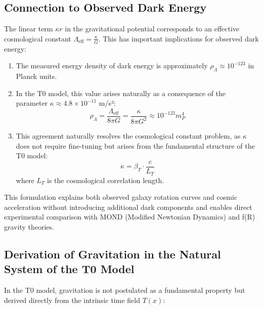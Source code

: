 \documentclass[12pt,a4paper]{article}
\begin{document}
	\subsection*{Connection to Observed Dark Energy}
	
	The linear term $\kappa r$ in the gravitational potential corresponds to an effective cosmological constant $\Lambda_{\text{eff}} = \frac{\kappa}{G}$. This has important implications for observed dark energy:
	
	\begin{enumerate}
		\item The measured energy density of dark energy is approximately $\rho_\Lambda \approx 10^{-123}$ in Planck units.
		
		\item In the T0 model, this value arises naturally as a consequence of the parameter $\kappa \approx 4.8 \times 10^{-11}$ m/s²:
		\[
		\rho_\Lambda = \frac{\Lambda_{\text{eff}}}{8\pi G} = \frac{\kappa}{8\pi G^2} \approx 10^{-123} m_P^4
		\]
		
		\item This agreement naturally resolves the cosmological constant problem, as $\kappa$ does not require fine-tuning but arises from the fundamental structure of the T0 model:
		\[
		\kappa = \beta_T \cdot \frac{c}{L_T}
		\]
		where $L_T$ is the cosmological correlation length.
	\end{enumerate}
	
	This formulation explains both observed galaxy rotation curves and cosmic acceleration without introducing additional dark components and enables direct experimental comparison with MOND (Modified Newtonian Dynamics) and f(R) gravity theories.
	
	\subsection*{Derivation of Gravitation in the Natural System of the T0 Model}
	
	In the T0 model, gravitation is not postulated as a fundamental property but derived directly from the intrinsic time field $T(x)$:
	
\end{document}
